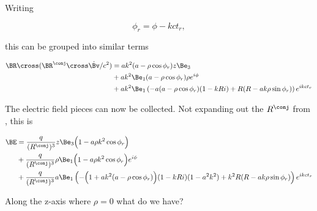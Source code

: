 {Writing

\begin{equation}\label{eqn:relativisticElectrodynamicsExamReflection:640}
\phi_r = \phi - k c t_r,
\end{equation}

this can be grouped into similar terms

\begin{equation}\label{eqn:relativisticElectrodynamicsExamReflection:660}
\begin{aligned}
\BR \cross (\BR^\conj \cross \dot{\Bv}/c^2)
&=
a k^2 
(a - \rho \cos\phi_r) z \Be_3 \\
&+ 
a k^2 
\Be_1
(a - \rho \cos\phi_r) \rho e^{i\phi} \\
&+ 
a k^2 
\Be_1
\left(
-a (a - \rho \cos\phi_r) (1 - k R i)
+ R(R - a k \rho \sin \phi_r)
\right) e^{i k c t_r}
\end{aligned}
\end{equation}

The electric field pieces can now be collected.  Not expanding out the $R^\conj$ from , this is

\begin{equation}\label{eqn:relativisticElectrodynamicsExamReflection:700}
\begin{aligned}
\BE &= 
\frac{q}{(R^\conj)^3} z \Be_3
\Bigl( 1 - a \rho k^2 \cos\phi_r \Bigr) \\
&+
\frac{q}{(R^\conj)^3} \rho
\Be_1 \Bigl(1 - a \rho k^2 \cos\phi_r \Bigr) e^{i\phi} \\
&+
\frac{q}{(R^\conj)^3} a \Be_1
\left(
-\Bigl( 1 + a k^2 (a - \rho \cos\phi_r) \Bigr) (1 - k R i)(1 - a^2 k^2)
+ k^2 R(R - a k \rho \sin \phi_r)
\right) e^{i k c t_r}
\end{aligned}
\end{equation}

Along the z-axis where $\rho = 0$ what do we have?

}
